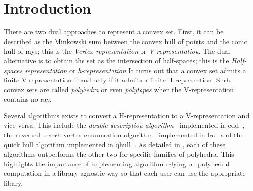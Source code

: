 \documentclass{juliacon}
\begin{document}


\maketitle

\begin{abstract}

    This paper introduces a Julia interface for polyhedral computation libraries such as cdd, lrs, qhull, porta or the parma polyhedra library.
    This notably includes conversion between the representation of a polyhedron as the intersection of half-spaces and hyper-planes and
    its representation as the convex hull of points and rays.
    Moreover, the interface covers the removal of redundant elements from the representations as well as detection of \emph{linearity}, i.e., hyper-planes
    formed by the intersection of half-spaces or lines by the conic hull of rays.
    The package also include a default pure-Julia library that implements the double description method for the representation conversion
    and redundancy removal or linearity detection using a linear programming solver implementing MathOptInterface.
    A polyhedron object is provided in order to abstract away the differences between the libraries and hence allowing to write library-agnostic code.
    This object lazily applies the representation conversion when needed.

\end{abstract}

\section{Introduction}

There are two dual approaches to represent a convex set.
First, it can be described as the Minkowski sum between the convex hull of points
and the conic hull of rays; this is the \emph{Vertex representation} or \emph{V-representation}.
The dual alternative is to obtain the set as the intersection of half-spaces;
this is the \emph{Half-spaces representation} or \emph{h-representation}
It turns out that a convex set admits a finite V-representation if and only if it admits a finite H-represention.
Such convex sets are called \emph{polyhedra} or even \emph{polytopes} when the V-representation contains no ray.

Several algorithms exists to convert a H-representation to a V-representation and vice-versa.
This include the \emph{double description algorithm}~\cite{motzkin1953double,fukuda1996double} implemented in cdd~\cite{fukuda2003cdd},
the reversed search vertex enumeration algorithm~\cite{avis1996reverse} implemented in lrs~\cite{avis1994ac,avis2000revised} and
the quick hull algorithm implemented in qhull~\cite{barber1996quickhull}.
As detailed in \cite{avis1995good}, each of these algorithms outperforms the other two for specific families of polyhedra.
This highlights the importance of implementing algorithm relying on polyhedral computation in a library-agnostic way
so that each user can use the appropriate libary.


\end{document}
